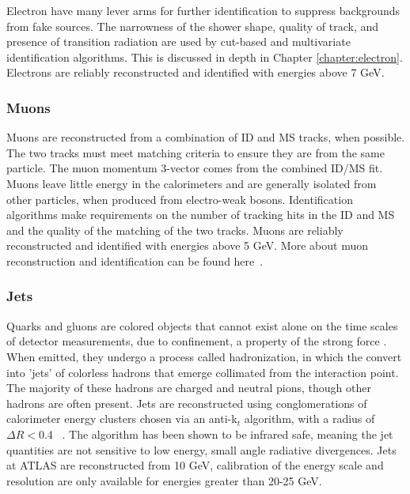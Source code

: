 Electron have many lever arms for further identification to suppress backgrounds from fake sources. The narrowness of the shower shape, quality of track, and presence of transition radiation are used by cut-based and multivariate identification algorithms. This is discussed in depth in Chapter \ref{chapter:electron}. Electrons are reliably reconstructed and identified with energies above 7 GeV. 

\subsubsection{Muons}

Muons are reconstructed from a combination of ID and MS tracks, when possible. The two tracks must meet matching criteria to ensure they are from the same particle. The muon momentum 3-vector comes from the combined ID/MS fit. Muons leave little energy in the calorimeters and are generally isolated from other particles, when produced from electro-weak bosons. Identification algorithms make requirements on the number of tracking hits in the ID and MS and the quality of the matching of the two tracks. Muons are reliably reconstructed and identified with energies above 5 GeV. More about muon reconstruction and identification can be found here~\cite{MCP2012}.


\subsubsection{Jets}

Quarks and gluons are colored objects that cannot exist alone on the time scales of detector measurements, due to confinement, a property of the strong force . When emitted, they undergo a process called hadronization, in which the convert into 'jets' of colorless hadrons that emerge collimated from the interaction point. The majority of these hadrons are charged and neutral pions, though other hadrons are often present. Jets are reconstructed using conglomerations of calorimeter energy clusters chosen via an anti-k$_t$ algorithm, with a radius of $\Delta R <$0.4 ~\cite{Cacciari:2008gp}. The algorithm has been shown to be infrared safe, meaning the jet quantities are not sensitive to low energy, small angle radiative divergences. Jets at ATLAS are reconstructed from 10 GeV, calibration of the energy scale and resolution are only available for energies greater than 20-25 GeV. 

